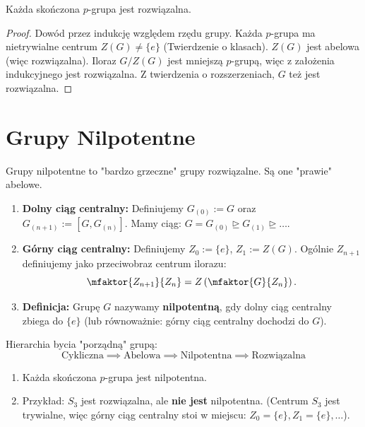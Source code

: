 \begin{theorem}
	Każda skończona $p$-grupa jest rozwiązalna.
\end{theorem} 
\begin{proof}
	Dowód przez indukcję względem rzędu grupy.
	Każda $p$-grupa ma nietrywialne centrum $Z(G) \neq \{e\}$ (Twierdzenie o klasach).
	$Z(G)$ jest abelowa (więc rozwiązalna).
	Iloraz $G/Z(G)$ jest mniejszą $p$-grupą, więc z założenia indukcyjnego jest rozwiązalna.
	Z twierdzenia o rozszerzeniach, $G$ też jest rozwiązalna.
\end{proof} 

\section{Grupy Nilpotentne}

Grupy nilpotentne to "bardzo grzeczne" grupy rozwiązalne. Są one "prawie" abelowe.

\begin{definition}
	\begin{enumerate}[label=\arabic*.]
		\item \textbf{Dolny ciąg centralny:}
		Definiujemy $G_{(0)} := G$ oraz $G_{(n+1)} := [G, G_{(n)}]$.
		Mamy ciąg: $G = G_{(0)} \unrhd G_{(1)} \unrhd \dots$.
		
		\item \textbf{Górny ciąg centralny:}
		Definiujemy $Z_0 := \{e\}$, $Z_1 := Z(G)$.
		Ogólnie $Z_{n+1}$ definiujemy jako przeciwobraz centrum ilorazu:
		\[ \mfaktor{Z_{n+1}}{Z_n} = Z\left( \mfaktor{G}{Z_n} \right). \]
		
		\item \textbf{Definicja:} Grupę $G$ nazywamy \textbf{nilpotentną}, gdy dolny ciąg centralny zbiega do $\{e\}$ (lub równoważnie: górny ciąg centralny dochodzi do $G$).
	\end{enumerate}
\end{definition}

\begin{intuition}
	Hierarchia bycia "porządną" grupą:
	\[ \text{Cykliczna} \implies \text{Abelowa} \implies \text{Nilpotentna} \implies \text{Rozwiązalna} \]
\end{intuition}

\begin{fact}
	\begin{enumerate}[label=\roman*)]
		\item Każda skończona $p$-grupa jest nilpotentna.
		\item Przykład: $S_3$ jest rozwiązalna, ale \textbf{nie jest} nilpotentna.
		(Centrum $S_3$ jest trywialne, więc górny ciąg centralny stoi w miejscu: $Z_0 = \{e\}, Z_1 = \{e\}, \dots$).
	\end{enumerate}
\end{fact}

